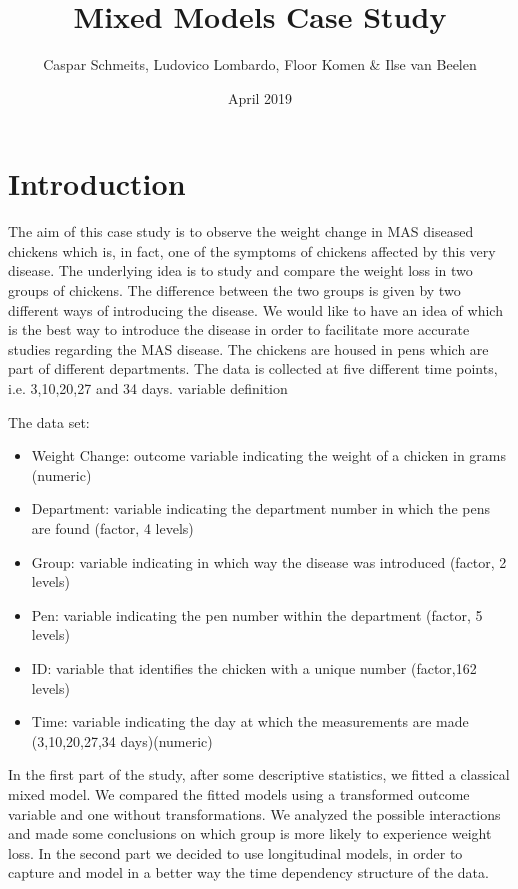 \documentclass{article}
\title{Mixed Models Case Study}
\author{Caspar Schmeits, Ludovico Lombardo, Floor Komen \& Ilse van Beelen}
\date{April 2019}
\begin{document}
\maketitle

\tableofcontents

\newpage
\section{Introduction}
The aim of this case study is to observe the weight change in MAS diseased chickens which is, in fact,  one of the symptoms of chickens affected by this very disease. 
The underlying idea is to study and compare the weight loss in two groups of chickens. The difference between the two groups is given by two different ways of introducing the disease.
We would like to have an idea of which is the best way to introduce the disease in order to facilitate more accurate studies regarding the MAS disease. 
The chickens are housed in pens which are part of different departments. The data is collected at five different time points, i.e. 3,10,20,27 and 34 days.
variable definition

The data set:
\begin{itemize}  
\item Weight Change: outcome variable indicating the weight of a chicken in grams (numeric)
\item Department: variable indicating the department number in which the pens are found (factor, 4 levels)
\item Group: variable indicating in which way the disease was introduced (factor, 2 levels)
\item Pen: variable indicating the pen number within the department (factor, 5 levels)
\item ID: variable that identifies the chicken with a unique number (factor,162 levels)
\item Time: variable indicating the day at which the measurements are made (3,10,20,27,34 days)(numeric)
\end{itemize}


In the first part of the study, after some descriptive statistics, we fitted a classical mixed model. We compared the fitted models using a transformed outcome variable and one without transformations. We analyzed the possible interactions and made some conclusions on which group is more likely to experience weight loss. In the second part we decided to use longitudinal models, in order to capture and model in a better way the time dependency structure of the data. 
\end{document}
